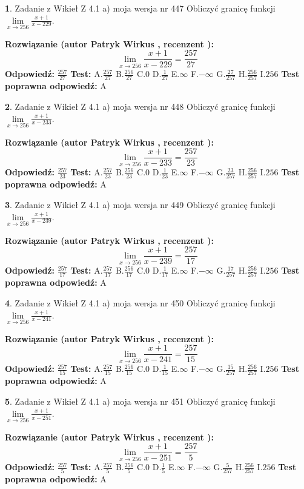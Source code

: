 \documentclass[12pt, a4paper]{article}
\theoremstyle{definition} %
\newtheorem{zad}{}
\newcommand{\zadStart}[1]{\begin{zad}#1\newline}
\newcommand{\zadStop}{\end{zad}}
\newcommand{\rozwStart}[2]{\noindent \textbf{Rozwiązanie (autor #1 , recenzent #2): }\newline}
\newcommand{\rozwStop}{\newline}
\newcommand{\odpStart}{\noindent \textbf{Odpowiedź:}\newline}
\newcommand{\odpStop}{\newline}
\newcommand{\testStart}{\noindent \textbf{Test:}\newline}
\newcommand{\testStop}{\newline}
\newcommand{\kluczStart}{\noindent \textbf{Test poprawna odpowiedź:}\newline}
\newcommand{\kluczStop}{\newline}
\begin{document}
\zadStart{Zadanie z Wikieł Z 4.1 a) moja wersja nr 447}
Obliczyć granicę funkcji $\lim\limits_{x\to256}\frac{x+1}{x-229}$.
\zadStop
\rozwStart{Patryk Wirkus}{}
$$\lim\limits_{x\to256}\frac{x+1}{x-229} = \frac{257}{27}$$
\rozwStop
\odpStart
$\frac{257}{27}$
\odpStop
\testStart
A.$\frac{257}{27}$
B.$\frac{256}{27}$
C.$0$
D.$\frac{1}{27}$
E.$\infty$
F.$-\infty$
G.$\frac{27}{257}$
H.$\frac{256}{257}$
I.$256$
\testStop
\kluczStart
A
\kluczStop



\zadStart{Zadanie z Wikieł Z 4.1 a) moja wersja nr 448}
Obliczyć granicę funkcji $\lim\limits_{x\to256}\frac{x+1}{x-233}$.
\zadStop
\rozwStart{Patryk Wirkus}{}
$$\lim\limits_{x\to256}\frac{x+1}{x-233} = \frac{257}{23}$$
\rozwStop
\odpStart
$\frac{257}{23}$
\odpStop
\testStart
A.$\frac{257}{23}$
B.$\frac{256}{23}$
C.$0$
D.$\frac{1}{23}$
E.$\infty$
F.$-\infty$
G.$\frac{23}{257}$
H.$\frac{256}{257}$
I.$256$
\testStop
\kluczStart
A
\kluczStop



\zadStart{Zadanie z Wikieł Z 4.1 a) moja wersja nr 449}
Obliczyć granicę funkcji $\lim\limits_{x\to256}\frac{x+1}{x-239}$.
\zadStop
\rozwStart{Patryk Wirkus}{}
$$\lim\limits_{x\to256}\frac{x+1}{x-239} = \frac{257}{17}$$
\rozwStop
\odpStart
$\frac{257}{17}$
\odpStop
\testStart
A.$\frac{257}{17}$
B.$\frac{256}{17}$
C.$0$
D.$\frac{1}{17}$
E.$\infty$
F.$-\infty$
G.$\frac{17}{257}$
H.$\frac{256}{257}$
I.$256$
\testStop
\kluczStart
A
\kluczStop



\zadStart{Zadanie z Wikieł Z 4.1 a) moja wersja nr 450}
Obliczyć granicę funkcji $\lim\limits_{x\to256}\frac{x+1}{x-241}$.
\zadStop
\rozwStart{Patryk Wirkus}{}
$$\lim\limits_{x\to256}\frac{x+1}{x-241} = \frac{257}{15}$$
\rozwStop
\odpStart
$\frac{257}{15}$
\odpStop
\testStart
A.$\frac{257}{15}$
B.$\frac{256}{15}$
C.$0$
D.$\frac{1}{15}$
E.$\infty$
F.$-\infty$
G.$\frac{15}{257}$
H.$\frac{256}{257}$
I.$256$
\testStop
\kluczStart
A
\kluczStop



\zadStart{Zadanie z Wikieł Z 4.1 a) moja wersja nr 451}
Obliczyć granicę funkcji $\lim\limits_{x\to256}\frac{x+1}{x-251}$.
\zadStop
\rozwStart{Patryk Wirkus}{}
$$\lim\limits_{x\to256}\frac{x+1}{x-251} = \frac{257}{5}$$
\rozwStop
\odpStart
$\frac{257}{5}$
\odpStop
\testStart
A.$\frac{257}{5}$
B.$\frac{256}{5}$
C.$0$
D.$\frac{1}{5}$
E.$\infty$
F.$-\infty$
G.$\frac{5}{257}$
H.$\frac{256}{257}$
I.$256$
\testStop
\kluczStart
A
\kluczStop
\end{document}
